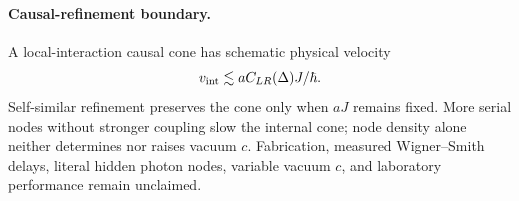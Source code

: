 \paragraph{Causal-refinement boundary.}
A local-interaction causal cone has schematic physical velocity
\[
 v_{\rm int}\lesssim aC_{LR}(\Delta)J/\hbar.
\]
Self-similar refinement preserves the cone only when $aJ$ remains
fixed.  More serial nodes without stronger coupling slow the internal
cone; node density alone neither determines nor raises vacuum $c$.
Fabrication, measured Wigner--Smith delays, literal hidden photon nodes,
variable vacuum $c$, and laboratory performance remain unclaimed.
